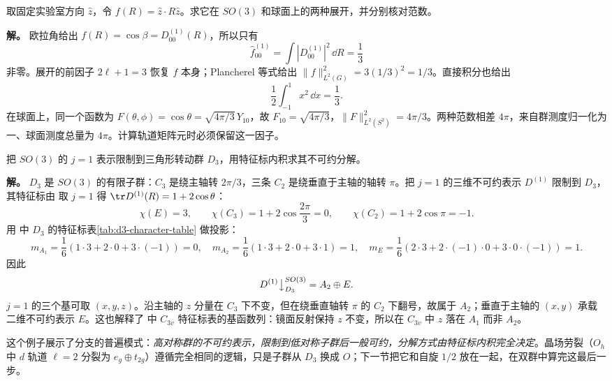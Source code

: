 \begin{example}
取固定实验室方向 $\hat z$，令 $f(R)=\hat z\cdot R\hat z$。求它在 $SO(3)$ 和球面上的两种展开，并分别核对范数。

\textbf{解。} 欧拉角给出 $f(R)=\cos\beta=D^{(1)}_{00}(R)$，所以只有
\[
\widehat f^{(1)}_{00}=\int|D^{(1)}_{00}|^2\,\dd R=\frac13
\]
非零。展开的前因子 $2\ell+1=3$ 恢复 $f$ 本身；Plancherel 等式给出 $\|f\|_{L^2(G)}^2=3(1/3)^2=1/3$。直接积分也给出
\[
\frac12\int_{-1}^{1}x^2\,\dd x=\frac13.
\]
在球面上，同一个函数为 $F(\theta,\phi)=\cos\theta=\sqrt{4\pi/3}\,Y_{10}$，故 $F_{10}=\sqrt{4\pi/3}$，$\|F\|_{L^2(S^2)}^2=4\pi/3$。两种范数相差 $4\pi$，来自群测度归一化为一、球面测度总量为 $4\pi$。计算轨道矩阵元时必须保留这一因子。
\end{example}

\begin{example}[$j=1$ 表示限制到 $D_3$：从球对称到三重轴]
\label{ex:j1-restrict-d3}
把 $SO(3)$ 的 $j=1$ 表示限制到三角形转动群 $D_3$，用特征标内积求其不可约分解。

\textbf{解。} $D_3$ 是 $SO(3)$ 的有限子群：$C_3$ 是绕主轴转 $2\pi/3$，三条 $C_2$ 是绕垂直于主轴的轴转 $\pi$。把 $j=1$ 的三维不可约表示 $D^{(1)}$ 限制到 $D_3$，其特征标由  取 $j=1$ 得 $\tr D^{(1)}(R)=1+2\cos\theta$：
\[
\chi(E)=3,\qquad \chi(C_3)=1+2\cos\frac{2\pi}{3}=0,\qquad \chi(C_2)=1+2\cos\pi=-1.
\]
用 中 $D_3$ 的特征标表\cref{tab:d3-character-table} 做投影：
\[
m_{A_1}=\frac16(1\cdot3+2\cdot0+3\cdot(-1))=0,
\quad
m_{A_2}=\frac16(1\cdot3+2\cdot0+3\cdot1)=1,
\quad
m_E=\frac16(2\cdot3+2\cdot(-1)\cdot0+3\cdot0\cdot(-1))=1.
\]
因此
\[
D^{(1)}\big\downarrow_{D_3}^{SO(3)}=A_2\oplus E.
\]
$j=1$ 的三个基可取 $(x,y,z)$。沿主轴的 $z$ 分量在 $C_3$ 下不变，但在绕垂直轴转 $\pi$ 的 $C_2$ 下翻号，故属于 $A_2$；垂直于主轴的 $(x,y)$ 承载二维不可约表示 $E$。这也解释了 中 $C_{3v}$ 特征标表的基函数列：镜面反射保持 $z$ 不变，所以在 $C_{3v}$ 中 $z$ 落在 $A_1$ 而非 $A_2$。

这个例子展示了分支的普遍模式：\emph{高对称群的不可约表示，限制到低对称子群后一般可约，分解方式由特征标内积完全决定}。晶场劳裂（$O_h$ 中 $d$ 轨道 $\ell=2$ 分裂为 $e_g\oplus t_{2g}$）遵循完全相同的逻辑，只是子群从 $D_3$ 换成 $O$；下一节把它和自旋 $1/2$ 放在一起，在双群中算完这最后一步。
\end{example}
